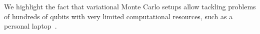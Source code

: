 \documentclass{ieeeaccess}
\begin{document}
We highlight the fact that variational Monte Carlo setups allow tackling problems of hundreds of qubits with very limited computational resources, such as a personal laptop~\cite{vargas2021tsp}.



\EOD
\end{document}
